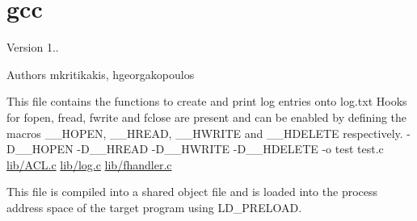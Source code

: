 \hypertarget{gcc-example}{}\section{gcc}
\begin{DoxyVersion}{Version}
1.. 
\end{DoxyVersion}
\begin{DoxyAuthor}{Authors}
mkritikakis, hgeorgakopoulos
\end{DoxyAuthor}
This file contains the functions to create and print log entries onto log.\+txt Hooks for fopen, fread, fwrite and fclose are present and can be enabled by defining the macros \+\_\+\+\_\+\+H\+O\+P\+EN, \+\_\+\+\_\+\+H\+R\+E\+AD, \+\_\+\+\_\+\+H\+W\+R\+I\+TE and \+\_\+\+\_\+\+H\+D\+E\+L\+E\+TE respectively. -\/\+D\+\_\+\+\_\+\+H\+O\+P\+EN -\/\+D\+\_\+\+\_\+\+H\+R\+E\+AD -\/\+D\+\_\+\+\_\+\+H\+W\+R\+I\+TE -\/\+D\+\_\+\+\_\+\+H\+D\+E\+L\+E\+TE -\/o test test.\+c \hyperlink{ACL_8c}{lib/\+A\+C\+L.\+c} \hyperlink{log_8c}{lib/log.\+c} \hyperlink{fhandler_8c}{lib/fhandler.\+c}

This file is compiled into a shared object file and is loaded into the process address space of the target program using L\+D\+\_\+\+P\+R\+E\+L\+O\+AD.


\begin{DoxyCodeInclude}
\end{DoxyCodeInclude}
 